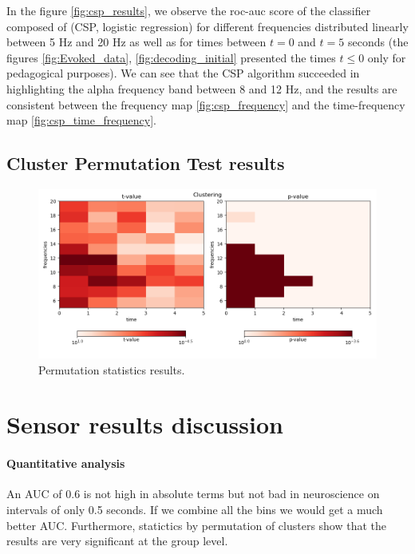 
In the figure \ref{fig:csp_results}, we observe the roc-auc score of the classifier composed of (CSP, logistic regression) for different frequencies distributed linearly between 5 Hz and 20 Hz as well as for times between $t=0$ and $t=5$ seconds (the figures \ref{fig:Evoked_data}, \ref{fig:decoding_initial} presented the times $t \leq 0$ only for pedagogical purposes). We can see that the CSP algorithm succeeded in highlighting the alpha frequency band between 8 and 12 Hz, and the results are consistent between the frequency map \ref{fig:csp_frequency} and the time-frequency map \ref{fig:csp_time_frequency}.

\subsection{Cluster Permutation Test results}

\begin{figure}[ht]
    \centering
    \includegraphics[width=15cm]{images_report/sensor/csp_permutation_res/permutations_test.png}
    \caption[Permutation statistics results.]%
    {Permutation statistics results.}
    \label{permutation_statistics_results}
\end{figure}

\section{Sensor results discussion}

\paragraph{Quantitative analysis}
An AUC of 0.6 is not high in absolute terms but not bad in neuroscience on intervals of only 0.5 seconds. If we combine all the bins we would get a much better AUC. Furthermore, statictics by permutation of clusters show that the results are very significant at the group level.

